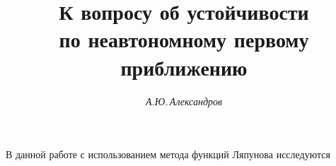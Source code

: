 




%


\newcommand{\tts}[1]{}


\renewcommand{\baselinestretch}{0.97}







\setcounter{page}{13}















\author{\it А.Ю.\,Александров}




\title{К вопросу об устойчивости\\


по неавтономному первому приближению}





\date{}




\pagestyle{plain} %







\maketitle


\label{begin}





В данной работе с использованием метода функций Ляпунова исследуются


